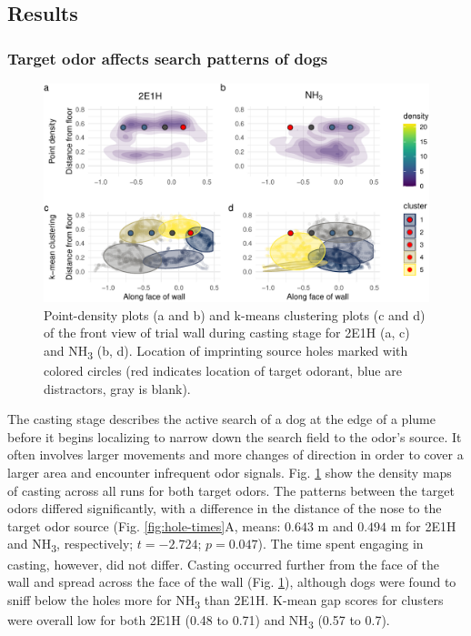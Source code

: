 \documentclass[
]{article}
\begin{document}
\hypertarget{results}{%
\subsection{Results}\label{results}}

\hypertarget{target-odor-affects-search-patterns-of-dogs}{%
\subsubsection{Target odor affects search patterns of dogs}\label{target-odor-affects-search-patterns-of-dogs}}

\begin{figure}
\centering
\includegraphics{main-manuscript_files/figure-latex/frontwall-casting-1.pdf}
\caption{\label{fig:frontwall-casting}Point-density plots (a and b) and k-means clustering plots (c and d) of the front view of trial wall during casting stage for 2E1H (a, c) and NH\textsubscript{3} (b, d). Location of imprinting source holes marked with colored circles (red indicates location of target odorant, blue are distractors, gray is blank).}
\end{figure}

The casting stage describes the active search of a dog at the edge of a plume before it begins localizing to narrow down the search field to the odor's source. It often involves larger movements and more changes of direction in order to cover a larger area and encounter infrequent odor signals. Fig. \ref{fig:frontwall-casting} show the density maps of casting across all runs for both target odors. The patterns between the target odors differed significantly, with a difference in the distance of the nose to the target odor source (Fig. \ref{fig:hole-times}A, means: \(0.643\) m and \(0.494\) m for 2E1H and NH\textsubscript{3}, respectively; \(t = -2.724\); \(p = 0.047\)). The time spent engaging in casting, however, did not differ. Casting occurred further from the face of the wall and spread across the face of the wall (Fig. \ref{fig:frontwall-casting}), although dogs were found to sniff below the holes more for NH\textsubscript{3} than 2E1H. K-mean gap scores for clusters were overall low for both 2E1H (0.48 to 0.71) and NH\textsubscript{3} (0.57 to 0.7).
\end{document}
